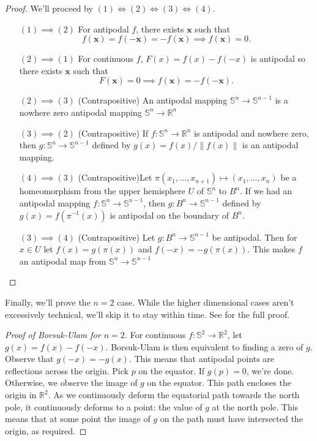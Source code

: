 \documentclass[12pt]{amsart}
\theoremstyle{definition}
\begin{document}
    \begin{proof} We'll proceed by $(1) \iff (2) \iff (3) \iff (4)$.

        \begin{enumerate}
            \item[$(1) \implies (2)$] For antipodal $f$, there exists $\mathbf x$ such that $$f(\mathbf x) = f(-\mathbf x) = -f(\mathbf x) \implies f(\mathbf x) = 0.$$
            \item[$(2) \implies (1)$] For continuous $f$, $F(x) = f(x) - f(-x)$ is antipodal so there exists $\mathbf x$ such that $$F(\mathbf x) = 0 \implies f(\mathbf x) = -f(-\mathbf x).$$
            \item[$(2) \implies (3)$] (Contrapositive) An antipodal mapping $\mathbb S^n \to \mathbb S^{n-1}$ is a nowhere zero antipodal mapping $\mathbb S^n \to \mathbb R^n$
            \item[$(3) \implies (2)$] (Contrapositive) If $f: \mathbb S^n \to \mathbb R^n$ is antipodal and nowhere zero, then $g: \mathbb S^n \to \mathbb S^{n-1}$ defined by $g(x) = f(x) / \|f(x)\|$ is an antipodal mapping.
            \item[$(4) \implies (3)$] (Contrapositive)Let $\pi (x_1, \dots, x_{n+1}) \mapsto (x_1, \dots, x_n)$ be a homeomorphism from the upper hemisphere $U$ of $\mathbb S^n$ to $B^n$. If we had an antipodal mapping $f: \mathbb S^n \to \mathbb S^{n-1}$, then $g: B^n \to \mathbb S^{n-1}$ defined by $g(x) = f(\pi^{-1}(x))$ is antipodal on the boundary of $B^n$.
            \item[$(3) \implies (4)$] (Contrapositive) Let $g: B^n \to \mathbb S^{n-1}$ be antipodal. Then for $x \in U$ let $f(x) = g(\pi(x))$ and $f(-x) = -g(\pi(x))$. This makes $f$ an antipodal map from $\mathbb S^n \to \mathbb S^{n-1}$
        \end{enumerate}
    \end{proof}

    Finally, we'll prove the $n=2$ case. While the higher dimensional cases aren't excessively technical, we'll skip it to stay within time. See \cite{stein} for the full proof.

    \begin{proof}[Proof of Borsuk-Ulam for $n=2$]
        For continuous $f: \mathbb S^2 \to \mathbb R^2$, let $g(x) = f(x) - f(-x)$. Borsuk-Ulam is then equivalent to finding a zero of $g$. Observe that $g(-x) = -g(x)$. This means that antipodal points are reflections across the origin. Pick $p$ on the equator. If $g(p) = 0$, we're done. Otherwise, we observe the image of $g$ on the equator. This path encloses the origin in $\mathbb R^2$. As we continuously deform the equatorial path towards the north pole, it continuously deforms to a point: the value of $g$ at the north pole. This means that at some point the image of $g$ on the path must have intersected the origin, as required.
    \end{proof}
\end{document}
